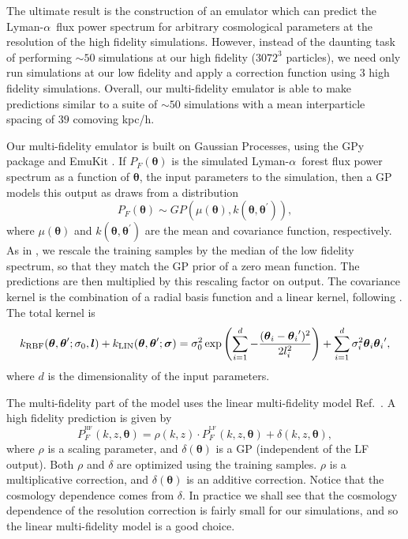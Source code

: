 \documentclass[a4paper,11pt]{article}
\newcommand{\Lya}{Lyman-$\alpha$}
\begin{document}
The ultimate result is the construction of an emulator which can predict the \Lya~flux power spectrum for arbitrary cosmological parameters at the resolution of the high fidelity simulations. However, instead of the daunting task of performing $\sim 50$ simulations at our high fidelity ($3072^3$ particles), we need only run simulations at our low fidelity and apply a correction function using $3$ high fidelity simulations. Overall, our multi-fidelity emulator is able to make predictions similar to a suite of $\sim 50$ simulations with a mean interparticle spacing of $39$ comoving kpc/h.

Our multi-fidelity emulator is built on Gaussian Processes, using the GPy
package \cite{gpy2014} and EmuKit \cite{2021arXiv211013293P}. If $P_F(\boldsymbol{\theta})$ is the simulated \Lya~forest flux power spectrum as a function of $\boldsymbol{\theta}$, the input parameters to the simulation, then a GP models this output as draws from a distribution
\begin{equation}
    P_F(\boldsymbol{\theta}) \sim GP(\mu(\boldsymbol{\theta}), k(\boldsymbol{\theta}, \boldsymbol{\theta}^{\prime})),
\end{equation}
where $\mu(\boldsymbol{\theta})$ and $k(\boldsymbol{\theta}, \boldsymbol{\theta}^{\prime})$ are the mean and covariance function, respectively.
As in \cite{Fernandez:2022}, we rescale the training samples by the median of the low fidelity spectrum, so that they match the GP prior of a zero mean function. The predictions are then multiplied by this rescaling factor on output. The covariance kernel is the combination of a radial basis function and a linear kernel, following \cite{Fernandez:2022}. The total kernel is
\begin{equation}
        k_\mathrm{RBF}(\boldsymbol{\theta}, \boldsymbol{\theta}'; \sigma_0, \boldsymbol{l}) + k_\mathrm{LIN}(\boldsymbol{\theta}, \boldsymbol{\theta}'; \boldsymbol{\sigma})\\
        = \sigma_0^2 \exp{\left( \sum_{i=1}^{d} -\frac{(\boldsymbol{\theta}_i - {\boldsymbol{\theta}_i}')^2}{2 l_i^2} \right)} +  \sum_{i=1}^{d} \sigma_i^2 \boldsymbol{\theta}_i {\boldsymbol{\theta}_i}',
\end{equation}
where $d$ is the dimensionality of the input parameters.

The multi-fidelity part of the model uses the linear multi-fidelity model Ref.~\citep{10.1093/biomet/87.1.1}. A high fidelity prediction is given by
\begin{equation}
    P_F^{^\mathrm{HF}}(k, z, \boldsymbol{\theta}) = \rho(k, z) \cdot P_F^{^\mathrm{LF}}(k, z, \boldsymbol{\theta}) + \delta(k, z, \boldsymbol{\theta}),
    \label{eq:ko_model}
\end{equation}
where $\rho$ is a scaling parameter, and $\delta(\boldsymbol{\theta})$ is a GP (independent of the LF output). Both $\rho$ and $\delta$ are optimized using the training samples. $\rho$ is a multiplicative correction, and $\delta(\boldsymbol{\theta})$ is an additive correction. Notice that the cosmology dependence comes from $\delta$. In practice we shall see that the cosmology dependence of the resolution correction is fairly small for our simulations, and so the linear multi-fidelity model is a good choice.
\end{document}
